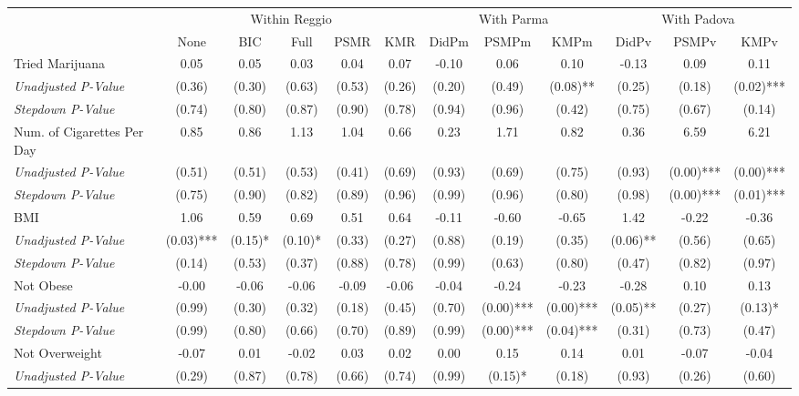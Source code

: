 \begin{tabular}{l c c c c c c c c c c c}
\toprule
& \multicolumn{5}{c}{Within Reggio} & \multicolumn{3}{c}{With Parma} & \multicolumn{3}{c}{With Padova} \\\cmidrule(lr){2-6} \cmidrule(lr){7-9} \cmidrule(lr){10-12}
 & None & BIC & Full & PSMR & KMR & DidPm & PSMPm & KMPm & DidPv & PSMPv & KMPv \\
\midrule
Tried Marijuana & 0.05 & 0.05 & 0.03 & 0.04 & 0.07 & -0.10 & 0.06 & 0.10 & -0.13 & 0.09 & 0.11 \\
\quad \textit{Unadjusted P-Value} & (0.36) & (0.30) & (0.63) & (0.53) & (0.26) & (0.20) & (0.49) & (0.08)** & (0.25) & (0.18) & (0.02)*** \\
\quad \textit{Stepdown P-Value} & (0.74) & (0.80) & (0.87) & (0.90) & (0.78) & (0.94) & (0.96) & (0.42) & (0.75) & (0.67) & (0.14) \\
Num. of Cigarettes Per Day & 0.85 & 0.86 & 1.13 & 1.04 & 0.66 & 0.23 & 1.71 & 0.82 & 0.36 & 6.59 & 6.21 \\
\quad \textit{Unadjusted P-Value} & (0.51) & (0.51) & (0.53) & (0.41) & (0.69) & (0.93) & (0.69) & (0.75) & (0.93) & (0.00)*** & (0.00)*** \\
\quad \textit{Stepdown P-Value} & (0.75) & (0.90) & (0.82) & (0.89) & (0.96) & (0.99) & (0.96) & (0.80) & (0.98) & (0.00)*** & (0.01)*** \\
BMI & 1.06 & 0.59 & 0.69 & 0.51 & 0.64 & -0.11 & -0.60 & -0.65 & 1.42 & -0.22 & -0.36 \\
\quad \textit{Unadjusted P-Value} & (0.03)*** & (0.15)* & (0.10)* & (0.33) & (0.27) & (0.88) & (0.19) & (0.35) & (0.06)** & (0.56) & (0.65) \\
\quad \textit{Stepdown P-Value} & (0.14) & (0.53) & (0.37) & (0.88) & (0.78) & (0.99) & (0.63) & (0.80) & (0.47) & (0.82) & (0.97) \\
Not Obese & -0.00 & -0.06 & -0.06 & -0.09 & -0.06 & -0.04 & -0.24 & -0.23 & -0.28 & 0.10 & 0.13 \\
\quad \textit{Unadjusted P-Value} & (0.99) & (0.30) & (0.32) & (0.18) & (0.45) & (0.70) & (0.00)*** & (0.00)*** & (0.05)** & (0.27) & (0.13)* \\
\quad \textit{Stepdown P-Value} & (0.99) & (0.80) & (0.66) & (0.70) & (0.89) & (0.99) & (0.00)*** & (0.04)*** & (0.31) & (0.73) & (0.47) \\
Not Overweight & -0.07 & 0.01 & -0.02 & 0.03 & 0.02 & 0.00 & 0.15 & 0.14 & 0.01 & -0.07 & -0.04 \\
\quad \textit{Unadjusted P-Value} & (0.29) & (0.87) & (0.78) & (0.66) & (0.74) & (0.99) & (0.15)* & (0.18) & (0.93) & (0.26) & (0.60) \\

\end{tabular}

